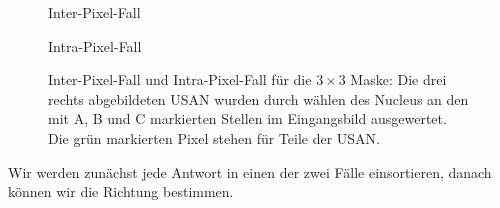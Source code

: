 \documentclass[a4paper, 11pt]{report}
\theoremstyle{definition}
\begin{document}
\begin{figure}[H]
\begin{center}
\begin{minipage}{0.45\textwidth}
						Inter-Pixel-Fall
						\vspace{1em}


						Intra-Pixel-Fall


					\end{minipage}

					\caption{Inter-Pixel-Fall und Intra-Pixel-Fall für die $3\times 3$ Maske: Die drei rechts abgebildeten USAN wurden durch wählen des Nucleus an den mit A, B und C markierten Stellen im Eingangsbild ausgewertet. Die grün markierten Pixel stehen für Teile der USAN.}
					\label{fig:inter-intra}
				\end{center}
			\end{figure}

			Wir werden zunächst jede Antwort in einen der zwei Fälle einsortieren, danach können wir die Richtung bestimmen.
\end{document}
